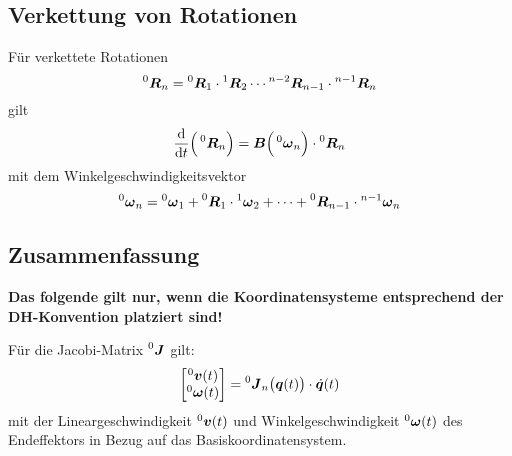 		\subsection{Verkettung von Rotationen}
			Für verkettete Rotationen
			\begin{equation*}
				\prescript{0}{}{\bm{R}}_n = \prescript{0}{}{\bm{R}}_1 \cdot \prescript{1}{}{\bm{R}}_2 \cdots \prescript{n - 2}{}{\bm{R}}_{n - 1} \cdot \prescript{n - 1}{}{\bm{R}}_n
			\end{equation*}
			gilt
			\begin{equation*}
				\dv{t} \Big( \prescript{0}{}{\bm{R}}_n \Big) = \bm{B}\Big(\prescript{0}{}{\bm{\omega}}_n\Big) \cdot \prescript{0}{}{\bm{R}}_n
			\end{equation*}
			mit dem Winkelgeschwindigkeitsvektor
			\begin{equation*}
				\prescript{0}{}{\bm{\omega}}_n = \prescript{0}{}{\bm{\omega}}_1 + \prescript{0}{}{\bm{R}}_1 \cdot \prescript{1}{}{\bm{\omega}}_2 + \cdots + \prescript{0}{}{\bm{R}}_{n - 1} \cdot \prescript{n - 1}{}{\bm{\omega}}_n
			\end{equation*}

		\subsection{Zusammenfassung}
			\textbf{Das folgende gilt nur, wenn die Koordinatensysteme entsprechend der DH-Konvention platziert sind!}

			Für die Jacobi-Matrix \( \prescript{0}{}{\bm{J}} \) gilt:
			\begin{equation*}
				\begin{bmatrix}
					\prescript{0}{}{\bm{v}}(t) \\
					\prescript{0}{}{\bm{\omega}}(t)
				\end{bmatrix}
				=
				\prescript{0}{}{\bm{J}}_n\big(\bm{q}(t)\big) \cdot \dot{\bm{q}}(t)
			\end{equation*}
			mit der Lineargeschwindigkeit \( \prescript{0}{}{\bm{v}}(t) \) und Winkelgeschwindigkeit \( \prescript{0}{}{\bm{\omega}}(t) \) des Endeffektors in Bezug auf das Basiskoordinatensystem.


